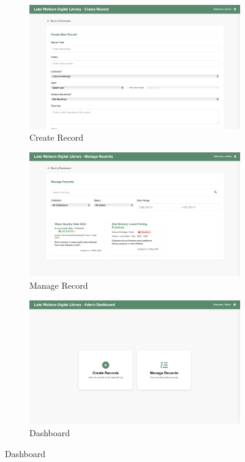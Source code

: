 \begin{figure}[H]
  \begin{subfigure}[b]{0.3\textwidth}
    \includegraphics[width=\textwidth]{screenshot/prototype_dashboard_createrecord.png}
    \caption{Create Record}
  \end{subfigure}\hfill
  \begin{subfigure}[b]{0.3\textwidth}
    \includegraphics[width=\textwidth]{screenshot/prototype_dashboard_managerecord.png}
    \caption{Manage Record}
  \end{subfigure}\hfill
  \begin{subfigure}[b]{0.3\textwidth}
    \includegraphics[width=\textwidth]{screenshot/prototype_dashboard.png}
    \caption{Dashboard}
  \end{subfigure}


\end{figure}
